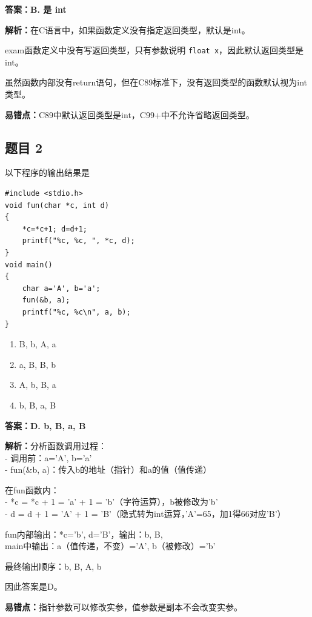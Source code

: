 \documentclass[12pt,a4paper]{ctexart}
\begin{document}
\begin{answerbox}
	\textbf{答案：B. 是 int}

	\textbf{解析：}在C语言中，如果函数定义没有指定返回类型，默认是int。

	exam函数定义中没有写返回类型，只有参数说明 \texttt{float x}，因此默认返回类型是int。

	虽然函数内部没有return语句，但在C89标准下，没有返回类型的函数默认视为int类型。

	\textbf{易错点：}C89中默认返回类型是int，C99+中不允许省略返回类型。
\end{answerbox}

\subsection*{题目 2}
以下程序的输出结果是
\begin{lstlisting}
#include <stdio.h>
void fun(char *c, int d)
{
    *c=*c+1; d=d+1;
    printf("%c, %c, ", *c, d);
}
void main()
{
    char a='A', b='a';
    fun(&b, a);
    printf("%c, %c\n", a, b);
}
\end{lstlisting}

\begin{enumerate}[label=\Alph*.]
	\item B, b, A, a
	\item a, B, B, b
	\item A, b, B, a
	\item b, B, a, B
\end{enumerate}

\begin{answerbox}
	\textbf{答案：D. b, B, a, B}

	\textbf{解析：}分析函数调用过程：\\
	- 调用前：a='A', b='a'\\
	- fun(\&b, a)：传入b的地址（指针）和a的值（值传递）

	在fun函数内：\\
	- *c = *c + 1 = 'a' + 1 = 'b'（字符运算），b被修改为'b'\\
	- d = d + 1 = 'A' + 1 = 'B'（隐式转为int运算，'A'=65，加1得66对应'B'）

	fun内部输出：*c='b', d='B'，输出：b, B,\\
	main中输出：a（值传递，不变）='A', b（被修改）='b'

	最终输出顺序：b, B, A, b

	因此答案是D。

	\textbf{易错点：}指针参数可以修改实参，值参数是副本不会改变实参。
\end{answerbox}
\end{document}
